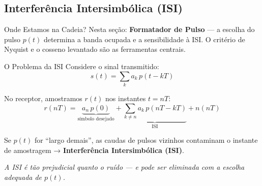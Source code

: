 
\subsection{Interferência Intersimbólica (ISI)}

\begin{frame}{Onde Estamos na Cadeia?}
  \vspace{0.1cm}
  {\small Nesta seção: \textbf{Formatador de Pulso} — a escolha do pulso
  $p(t)$ determina a banda ocupada e a sensibilidade à ISI.
  O critério de Nyquist e o cosseno levantado são as ferramentas centrais.}
\end{frame}

\begin{frame}{O Problema da ISI}
  Considere o sinal transmitido:
  \[
    s(t) = \sum_{k} a_k\, p(t - kT)
  \]

  No receptor, amostramos $r(t)$ nos instantes $t = nT$:
  \[
    r(nT) = \underbrace{a_n\, p(0)}_{\text{símbolo desejado}}
    + \underbrace{\sum_{k \neq n} a_k\, p(nT - kT)}_{\text{ISI}}
    + n(nT)
  \]

  \vspace{0.3cm}
  Se $p(t)$ for ``largo demais'', as \alert{caudas} de pulsos vizinhos
  contaminam o instante de amostragem → \textbf{Interferência Intersimbólica (ISI)}.

  \vspace{0.3cm}
  \textit{A ISI é tão prejudicial quanto o ruído — e pode ser eliminada
  com a escolha adequada de $p(t)$.}
\end{frame}


